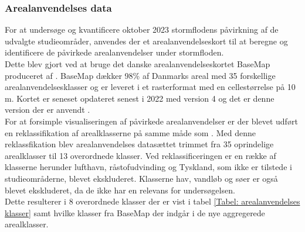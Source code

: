 \subsubsection{Arealanvendelses data} \label{Afsnit: Arealanvendelses data}
For at undersøge og kvantificere oktober 2023 stormflodens påvirkning af de udvalgte studieområder, anvendes der et arealanvendelseskort til at beregne og identificere de påvirkede arealanvendelser under stormfloden. \\
Dette blev gjort ved at bruge det danske arealanvendelseskortet BaseMap produceret af \cite{Jepsen_levin_2013}. BaseMap dækker 98\% af Danmarks areal med 35 forskellige arealanvendelsesklasser og er leveret i et rasterformat med en cellestørrelse på 10 m. Kortet er seneset opdateret senest i 2022 med version 4 og det er denne version der er anvendt \citep{levin_basemap04_2022}.\\

For at forsimple visualiseringen af påvirkede arealanvendelser er der blevet udført en reklassifikation af arealklasserne på samme måde som \cite{balstrom_kirby_inundation}. Med denne reklassfikation blev arealanvendelses datasættet trimmet fra 35 oprindelige arealklasser til 13 overordnede klasser. Ved reklassificeringen er en række af klasserne herunder lufthavn, råstofudvinding og Tyskland, som ikke er tilstede i studieområderne, blevet ekskluderet. Klasserne hav, vandløb og søer er også blevet ekskluderet, da de ikke har en relevans for undersøgelsen.\\ Dette resulterer i 8 overordnede klasser der er vist i tabel \ref{Tabel: arealanvendelses klasser} samt hvilke klasser fra BaseMap der indgår i de nye aggregerede arealklasser.


